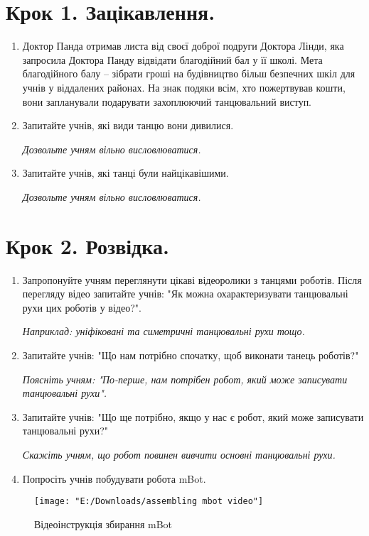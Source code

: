 \documentclass[12pt, a4paper]{article}
\begin{document}
	\section*{\textbf{Крок 1. Зацікавлення.}}
	\begin{enumerate}
		\item Доктор Панда отримав листа від своєї доброї подруги Доктора Лінди, яка запросила Доктора Панду відвідати благодійний бал у її школі. Мета благодійного балу – зібрати гроші на будівництво більш безпечних шкіл для учнів у віддалених районах. На знак подяки всім, хто пожертвував кошти, вони запланували подарувати захоплюючий танцювальний виступ.
		\item Запитайте учнів, які види танцю вони дивилися.
		
		\textit{Дозвольте учням вільно висловлюватися.}
		\item Запитайте учнів, які танці були найцікавішими.
		
		\textit{Дозвольте учням вільно висловлюватися.}
	\end{enumerate}

	\section*{\textbf{Крок 2. Розвідка.}}
	\begin{enumerate}
		\item Запропонуйте учням переглянути цікаві відеоролики з танцями роботів. Після перегляду відео запитайте учнів: "Як можна охарактеризувати танцювальні рухи цих роботів у відео?".
		
		\textit{Наприклад: уніфіковані та симетричні танцювальні рухи тощо.}
		\item Запитайте учнів: "Що нам потрібно спочатку, щоб виконати танець роботів?"
		
		\textit{Поясніть учням: "По-перше, нам потрібен робот, який може записувати танцювальні рухи".}
		\item Запитайте учнів: "Що ще потрібно, якщо у нас є робот, який може записувати танцювальні рухи?"
		
		\textit{Скажіть учням, що робот повинен вивчити основні танцювальні рухи.}
		\item Попросіть учнів побудувати робота mBot.
	
	\end{enumerate}
		
\begin{figure} [H]
	\centering
	\texttt{[image: "E:/Downloads/assembling mbot video"]}
	\caption[Відеоінструкція збирання mBot]{Відеоінструкція збирання mBot}
	\label{fig:assembling-mbot-video}
\end{figure}
\end{document}
